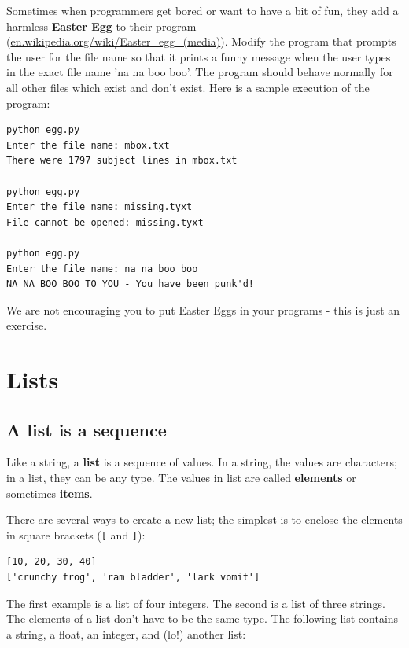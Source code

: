 \documentclass[10pt]{book}
\begin{document}
\begin{ex}
Sometimes when programmers get bored or want to have a bit of fun,
they add a harmless {\bf Easter Egg} to their program 
(\url{en.wikipedia.org/wiki/Easter_egg_(media)}). Modify the program
that prompts the user for the file name so that it prints a funny
message when the user types in the exact file name 'na na boo boo'. 
The program should behave normally for all other files which exist
and don't exist.  Here is a sample execution of the program:

\beforeverb
\begin{verbatim}
python egg.py 
Enter the file name: mbox.txt
There were 1797 subject lines in mbox.txt

python egg.py 
Enter the file name: missing.tyxt
File cannot be opened: missing.tyxt

python egg.py 
Enter the file name: na na boo boo
NA NA BOO BOO TO YOU - You have been punk'd!
\end{verbatim}
\afterverb
%
We are not encouraging you to put Easter Eggs in your programs -
this is just an exercise.

\end{ex}

\chapter{Lists}



\section{A list is a sequence}

Like a string, a {\bf list} is a sequence of values.  In a string, the
values are characters; in a list, they can be any type.  The values in
list are called {\bf elements} or sometimes {\bf items}.


There are several ways to create a new list; the simplest is to
enclose the elements in square brackets (\verb"[" and \verb"]"):

\beforeverb
\begin{verbatim}
[10, 20, 30, 40]
['crunchy frog', 'ram bladder', 'lark vomit']
\end{verbatim}
\afterverb
%
The first example is a list of four integers.  The second is a list of
three strings.  The elements of a list don't have to be the same type.
The following list contains a string, a float, an integer, and
(lo!) another list:
\end{document}
